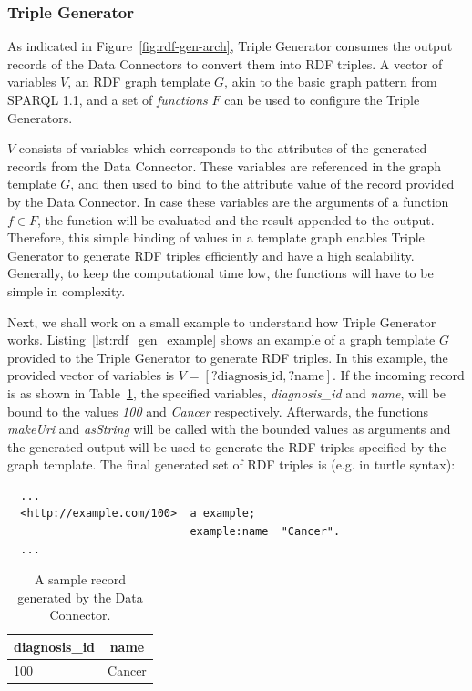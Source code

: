 \subsubsection{Triple Generator}
As indicated in Figure~\ref{fig:rdf-gen-arch}, Triple Generator consumes the output records 
of the Data Connectors to convert them into RDF triples. A vector of variables $V$, an RDF 
graph template $G$, akin to the basic graph pattern from SPARQL 1.1, and a 
set of \emph{functions} $F$ can be used to configure the Triple Generators. 

$V$ consists of variables which corresponds to the attributes of the
generated records from the Data Connector. These variables are referenced 
in the graph template $G$, and then used to 
bind to the attribute value of the record provided by the Data Connector. 
In case these variables are the arguments of a function $f \in F$, the function will 
be evaluated and the result appended to the output. Therefore, 
this simple binding of values in a template graph enables Triple Generator to 
generate RDF triples efficiently and have a high scalability. Generally, to 
keep the computational time low, the functions will have to be simple in complexity. 


Next, we shall work on a small example to understand how Triple Generator works. 
Listing~\ref{lst:rdf_gen_example} shows an example of a graph template $G$ provided to 
the Triple Generator to generate RDF triples. In this example, the provided vector 
of variables is $V = [\textrm{?diagnosis\_id}, \textrm{?name} ]$. If the incoming record 
is as shown in Table~\ref{tab:rdf_gen_sample_record}, the specified variables,
\emph{diagnosis\_id} and \emph{name}, will be bound to the values \emph{100} and 
\emph{Cancer} respectively. Afterwards, the functions \emph{makeUri} and \emph{asString} will 
be called with the bounded values as arguments and the generated 
output will be used to generate the RDF triples specified by 
the graph template. 
The final generated set of RDF triples is (e.g. in turtle syntax): 

\begin{lstlisting}
  ... 
  <http://example.com/100>  a example; 
                            example:name  "Cancer". 
  ...
\end{lstlisting}


\begin{table}[!htbp]
  \centering
  \begin{tabular}{l|l}
  \multicolumn{1}{c|}{\textbf{diagnosis\_id}} & \multicolumn{1}{c}{\textbf{name}} \\ \hline
  100                                 & Cancer                    
  \end{tabular}
  \caption{A sample record generated by the Data Connector.}
  \label{tab:rdf_gen_sample_record}
  \end{table}

